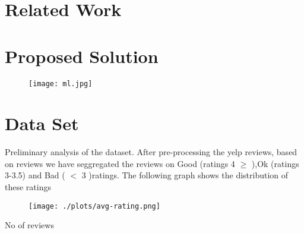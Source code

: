 \documentclass{article} %
\begin{document}
\begin{abstract}


\end{abstract}


\section{Related Work}



\section{Proposed Solution}


\begin{figure}[h]
  \begin{center}
    \texttt{[image: ml.jpg]}
    \label{fig:1}
    \caption{}
  \end{center}
\end{figure}


\section{Data Set}

Preliminary analysis of the dataset. After pre-processing the yelp reviews, based on reviews we have seggregated the reviews on Good (ratings 4 $\geq$  ),Ok (ratings 3-3.5) and Bad ( $<$ 3 )ratings. The following graph shows the distribution of these ratings

\begin{figure}[h]
  \begin{center}
    \texttt{[image: ./plots/avg-rating.png]}
    \label{fig:}
    \caption{}
  \end{center}
\end{figure}


No of reviews 
\end{document}
